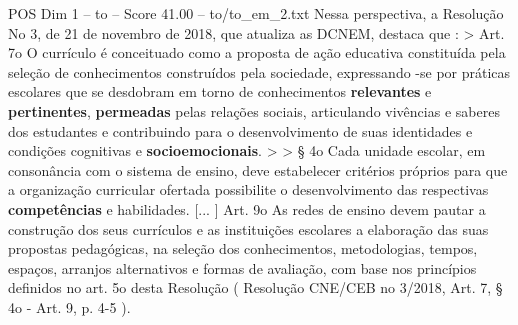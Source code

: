 \begin{textsample}{POS Dim 1 – to – Score 41.00 – to/to\_em\_2.txt}
Nessa perspectiva, a Resolução No 3, de 21 de novembro de 2018, que atualiza as DCNEM, destaca que : > Art. 7o O currículo é conceituado como a proposta de ação educativa constituída pela seleção de conhecimentos construídos pela sociedade, expressando -se por práticas escolares que se desdobram em torno de conhecimentos \textbf{relevantes} e \textbf{pertinentes}, \textbf{permeadas} pelas relações sociais, articulando vivências e saberes dos estudantes e contribuindo para o desenvolvimento de suas identidades e condições cognitivas e \textbf{socioemocionais}. > > § 4o Cada unidade escolar, em consonância com o sistema de ensino, deve estabelecer critérios próprios para que a organização curricular ofertada possibilite o desenvolvimento das respectivas \textbf{competências} e habilidades. [... ] Art. 9o As redes de ensino devem pautar a construção dos seus currículos e as instituições escolares a elaboração das suas propostas pedagógicas, na seleção dos conhecimentos, metodologias, tempos, espaços, arranjos alternativos e formas de avaliação, com base nos princípios definidos no art. 5o desta Resolução ( Resolução CNE/CEB no 3/2018, Art. 7, § 4o - Art. 9, p. 4-5 ).

\end{textsample}
